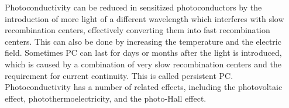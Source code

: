 \documentclass{article}
\begin{document}
Photoconductivity can be reduced in sensitized photoconductors by the introduction of more light of a different wavelength which interferes with slow recombination centers, effectively converting them into fast recombination centers. This can also be done by increasing the temperature and the electric field. Sometimes PC can last for days or months after the light is introduced, which is caused by a combination of very slow recombination centers and the requirement for current continuity. This is called persistent PC. Photoconductivity has a number of related effects, including the photovoltaic effect, photothermoelectricity, and the photo-Hall effect.

\printbibliography
\end{document}
